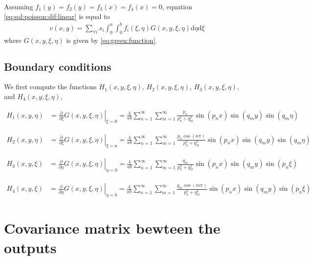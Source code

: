 \documentclass[a4paper,10pt]{article}
\newcommand{\dif}{\textrm{d}}
\begin{document}
Assuming $f_1(y) = f_2(y)= f_3(x) = f_4(x) = 0$, equation \eqref{eq:sol:poisson:dif:linear} is equal to
\begin{align}
v(x,y)= \sum_{\forall i}s_{i} \int_{0}^{a}\int_{0}^{b}f_i(\xi,\eta)G(x, y,\xi,\eta)\dif{\eta}\dif{\xi}\label{eq:sol:poisson:dif:linear:init:hom}
\end{align}
where $G(x, y, \xi,\eta)$ is given by \eqref{eq:green:function}.

\subsection*{Boundary conditions}

We first compute the functions $H_1(x, y, \xi, \eta)$, $H_2(x, y, \xi, \eta)$,
$H_3(x, y, \xi, \eta)$, and $H_4(x, y, \xi, \eta)$,

\begin{align*}
  H_1(x, y,\eta)& =\left.\frac{\partial}{\partial\xi}G(x, y, \xi,\eta)\right|_{\xi=0}
  = \frac{4}{ab}\sum_{n=1}^\infty
                  \sum_{m=1}^\infty \frac{p_n}{p_n^2 + q_m^2}\sin\left({p_n x}\right)
\sin\left(q_m y\right)\sin\left(q_m \eta\right)
\end{align*}

\begin{align*}
  H_2(x, y,\eta)& =\left.\frac{\partial}{\partial\xi}G(x, y, \xi,\eta)\right|_{\xi=a}
  = \frac{4}{ab}\sum_{n=1}^\infty
  \sum_{m=1}^\infty\frac{p_n\cos(n\pi)}{p_n^2 + q_m^2}
  \sin\left({p_n x}\right)\sin\left(q_m y\right)\sin\left(q_m \eta\right)
\end{align*}

\begin{align*}
  H_3(x, y,\xi)& =\left.\frac{\partial}{\partial\eta}G(x, y, \xi,\eta)\right|_{\eta=0}
  = \frac{4}{ab}\sum_{n=1}^\infty
                  \sum_{m=1}^\infty \frac{q_m}{p_n^2 + q_m^2}\sin\left({p_n x}\right)
\sin\left(q_m y\right)\sin\left(p_n \xi\right)
\end{align*}

\begin{align*}
  H_4(x, y,\xi)& =\left.\frac{\partial}{\partial\eta}G(x, y, \xi,\eta)\right|_{\eta=b}
  = \frac{4}{ab}\sum_{n=1}^\infty
  \sum_{m=1}^\infty\frac{q_m\cos(m\pi)}{p_n^2 + q_m^2}
  \sin\left({p_n x}\right)\sin\left(q_m y\right)\sin\left(p_n \xi\right)
\end{align*}



\section{Covariance matrix bewteen the outputs}
\end{document}
